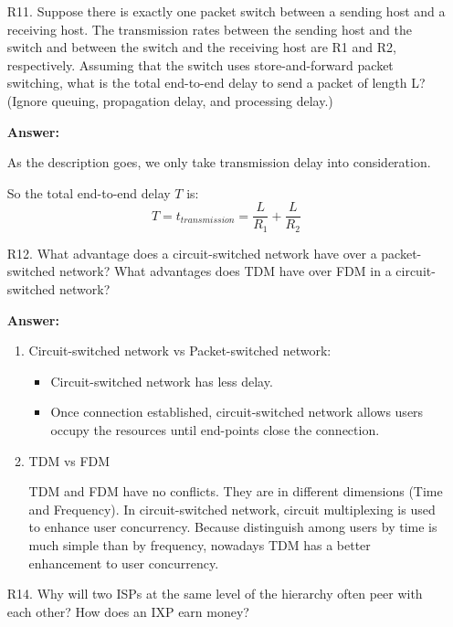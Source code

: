 \begin{enumerate}
	\item[R11.] Suppose there is exactly one packet switch between a sending host and a receiving host. The transmission rates between the sending host and the switch and between the switch and the receiving host are R1 and R2, respectively. Assuming that the switch uses store-and-forward packet switching, what is the total end-to-end delay to send a packet of length L? (Ignore queuing, propagation delay, and processing delay.)
	
	\textbf{Answer:}
	
    As the description goes, we only take transmission delay into consideration.

    So the total end-to-end delay $T$ is:
	$$
		T = t_{transmission} = \frac{L}{R_{1}} + \frac{L}{R_{2}}
	$$

	\item[R12.]
	What advantage does a circuit-switched network have over a packet-switched
	network? What advantages does TDM have over FDM in a circuit-switched
	network?
	
	\textbf{Answer:}
	
	\begin{enumerate}
		\item Circuit-switched network vs Packet-switched network:

		\begin{itemize}
			\item Circuit-switched network has less delay.
			
			\item Once connection established, circuit-switched network allows users occupy the resources until end-points close the connection.
		\end{itemize}
	
		\item TDM vs FDM
		
		TDM and FDM have no conflicts. They are in different dimensions (Time and Frequency). In circuit-switched network, circuit multiplexing is used to enhance user concurrency. Because distinguish among users by time is much simple than by frequency, nowadays TDM has a better enhancement to user concurrency.
		
	\end{enumerate}
	
	\item[R14.] Why will two ISPs at the same level of the hierarchy often peer with each other? How does an IXP earn money?
	

\end{enumerate}
